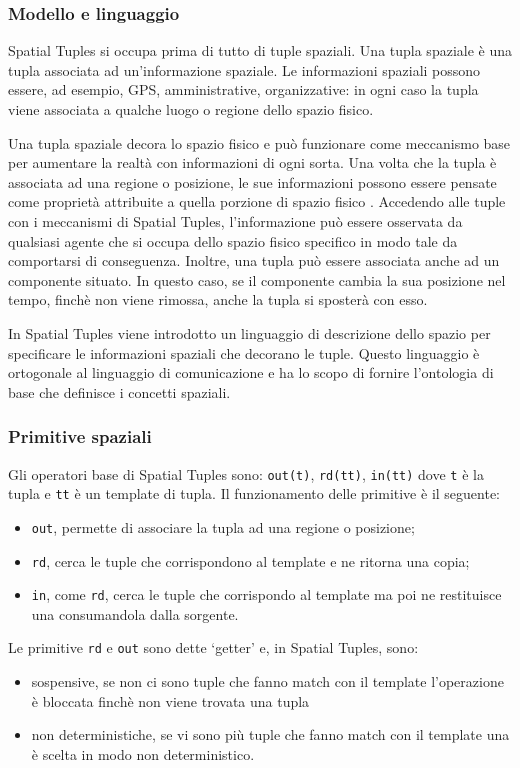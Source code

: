 \subsubsection{Modello e linguaggio}
Spatial Tuples si occupa prima di tutto di tuple spaziali. Una tupla spaziale è una tupla associata ad un'informazione spaziale. Le informazioni spaziali possono essere, ad esempio, GPS, amministrative, organizzative: in ogni caso la tupla viene associata a qualche luogo o regione dello spazio fisico.

Una tupla spaziale decora lo spazio fisico e può funzionare come meccanismo base per aumentare la realtà con informazioni di ogni sorta. Una volta che la tupla è associata ad una regione o posizione, le sue informazioni possono essere pensate come proprietà attribuite a quella porzione di spazio fisico \cite{SpatialTuples}. Accedendo alle tuple con i meccanismi di Spatial Tuples, l'informazione può essere osservata da qualsiasi agente che si occupa dello spazio fisico specifico in modo tale da comportarsi di conseguenza.
%
Inoltre, una tupla può essere associata anche ad un componente situato. In questo caso, se il componente cambia la sua posizione nel tempo, finchè non viene rimossa, anche la tupla si sposterà con esso.

In Spatial Tuples viene introdotto un linguaggio di descrizione dello spazio per specificare le informazioni spaziali che decorano le tuple. Questo linguaggio è ortogonale al linguaggio di comunicazione e ha lo scopo di fornire l'ontologia di base che definisce i concetti spaziali.

\subsubsection{Primitive spaziali}
Gli operatori base di Spatial Tuples sono: \texttt{out(t)}, \texttt{rd(tt)}, \texttt{in(tt)} dove \texttt{t} è la tupla e \texttt{tt} è un template di tupla. Il funzionamento delle primitive è il seguente:
\begin{itemize}
\item \texttt{out}, permette di associare la tupla ad una regione o posizione;
\item \texttt{rd}, cerca le tuple che corrispondono al template e ne ritorna una copia;
\item \texttt{in}, come \texttt{rd}, cerca le tuple che corrispondo al template ma poi ne restituisce una consumandola dalla sorgente.
\end{itemize}
Le primitive \texttt{rd} e \texttt{out} sono dette `getter' e, in Spatial Tuples, sono:
\begin{itemize}
\item sospensive, se non ci sono tuple che fanno match con il template l'operazione è bloccata finchè non viene trovata una tupla
\item non deterministiche, se vi sono più tuple che fanno match con il template una è scelta in modo non deterministico.
\end{itemize}
